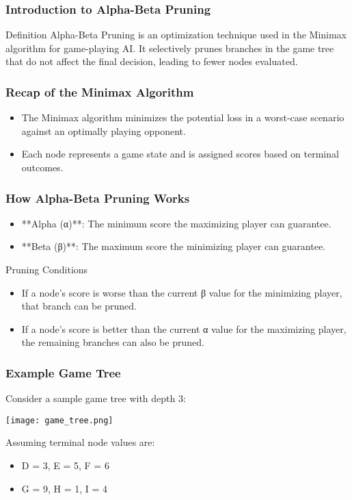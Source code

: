 \documentclass[aspectratio=169]{beamer}
\begin{document}
\begin{frame}[fragile]
    \frametitle{Introduction to Alpha-Beta Pruning}
    \begin{block}{Definition}
        Alpha-Beta Pruning is an optimization technique used in the Minimax algorithm for game-playing AI. It selectively prunes branches in the game tree that do not affect the final decision, leading to fewer nodes evaluated.
    \end{block}
\end{frame}

\begin{frame}[fragile]
    \frametitle{Recap of the Minimax Algorithm}
    \begin{itemize}
        \item The Minimax algorithm minimizes the potential loss in a worst-case scenario against an optimally playing opponent.
        \item Each node represents a game state and is assigned scores based on terminal outcomes.
    \end{itemize}
\end{frame}

\begin{frame}[fragile]
    \frametitle{How Alpha-Beta Pruning Works}
    \begin{itemize}
        \item **Alpha (α)**: The minimum score the maximizing player can guarantee.
        \item **Beta (β)**: The maximum score the minimizing player can guarantee.
    \end{itemize}
    \begin{block}{Pruning Conditions}
        \begin{itemize}
            \item If a node's score is worse than the current β value for the minimizing player, that branch can be pruned.
            \item If a node's score is better than the current α value for the maximizing player, the remaining branches can also be pruned.
        \end{itemize}
    \end{block}
\end{frame}

\begin{frame}[fragile]
    \frametitle{Example Game Tree}
    Consider a sample game tree with depth 3:
    \begin{center}
        \texttt{[image: game\_tree.png]}
    \end{center}
    Assuming terminal node values are:
    \begin{itemize}
        \item D = 3, E = 5, F = 6
        \item G = 9, H = 1, I = 4
    \end{itemize}
\end{frame}
\end{document}
